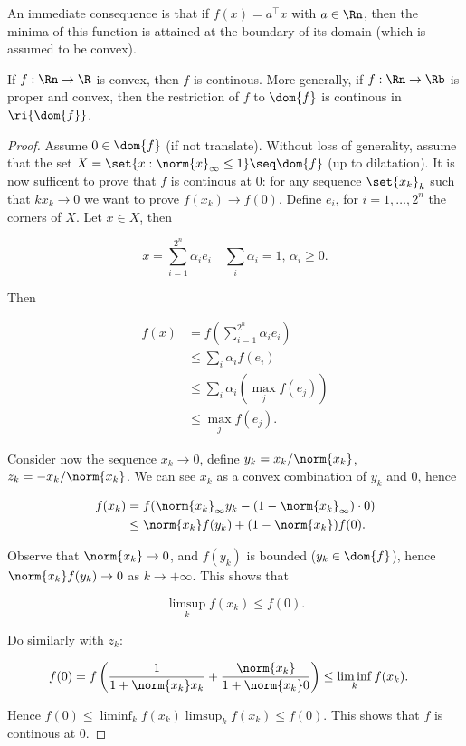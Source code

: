 An immediate consequence is that if $f(x) = a^\top x$ with $a \in \Rn$, then the minima of this function is attained at the boundary of its domain (which is assumed to be convex).

\begin{proposition}
    
    If $f : \Rn \to \R$ is convex, then $f$ is continous. More generally, if $f : \Rn \to \Rb$ is proper and convex, then the restriction of $f$ to $\dom{f}$ is continous in $\ri{\dom{f}}$.

\end{proposition}

\begin{proof}
    
    Assume $0 \in \dom{f}$ (if not translate). Without loss of generality, assume that the set $X = \set{x : \norm{x}_\infty \le 1} \seq \dom{f}$ (up to dilatation). It is now sufficent to prove that $f$ is continous at $0$: for any sequence $\set{x_k}_k$ such that $kx_k \to 0$ we want to prove $f(x_k) \to f(0)$. Define $e_i$, for $i = 1,\dots,2^n$ the corners of $X$. Let $x \in X$, then 

    \[ x = \sum_{i=1}^{2^n} \alpha_i e_i\quad \sum_i \alpha_i = 1, \, \alpha_i \ge 0. \]

    Then 

    \begin{align*}
        f(x) &= f\left(\sum_{i=1}^{2^n} \alpha_i e_i\right) \\
            &\le \sum_i \alpha_i f(e_i) \\
            &\le \sum_i \alpha_i \left(\max_j f(e_j)\right) \\
            &\le \max_j f(e_j).
    \end{align*}

    Consider now the sequence $x_k \to 0$, define $y_k = x_k/\norm{x_k}$, $z_k = -x_k/\norm{x_k}$. We can see $x_k$ as a convex combination of $y_k$ and 0, hence 

    \begin{align*}
        f(x_k) &= f(\norm{x_k}_\infty y_k - (1-\norm{x_k}_\infty)\cdot 0) \\ 
            &\le \norm{x_k}f(y_k) + (1-\norm{x_k})f(0).
    \end{align*}

    Observe that $\norm{x_k} \to 0$, and $f(y_k)$ is bounded ($y_k \in \dom{f}$), hence $\norm{x_k}f(y_k) \to 0$ as $k \to +\infty$. This shows that 

    \[ \limsup_k f(x_k) \le f(0). \]

    Do similarly with $z_k$: 

    \begin{align*}
        f(0) &= f\left(\frac{1}{1+\norm{x_k}x_k} + \frac{\norm{x_k}}{1+\norm{x_k}0}\right) \le \liminf_k f(x_k).
    \end{align*}

    Hence $f(0) \le \liminf_k f(x_k) \limsup_k f(x_k) \le f(0)$. This shows that $f$ is continous at 0.

\end{proof}

